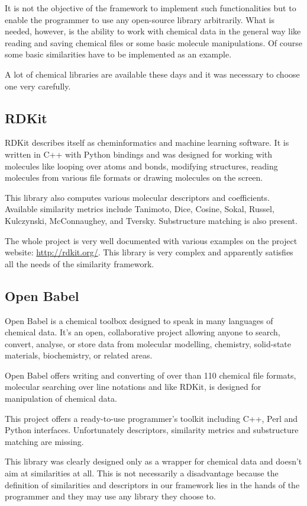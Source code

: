 \documentclass[thesis=M,english]{FITthesis}[2012/10/20]
\begin{document}
It is not the objective of the framework to implement such functionalities but to enable the programmer to use any open-source library arbitrarily. What is needed, however, is the ability to work with chemical data in the general way like reading and saving chemical files or some basic molecule manipulations. Of course some basic similarities have to be implemented as an example. 

A lot of chemical libraries are available these days and it was necessary to choose one very carefully.


\subsection{RDKit}
RDKit describes itself as cheminformatics and machine learning software.  It is written in C++ with Python bindings and was designed for working with molecules like looping over atoms and bonds, modifying structures, reading molecules from various file formats or drawing molecules on the screen. 

This library also computes various molecular descriptors and coefficients. Available similarity metrics include Tanimoto, Dice, Cosine, Sokal, Russel, Kulczynski, McConnaughey, and Tversky. Substructure matching is also present.

The whole project is very well documented with various examples on the project website: \url{http://rdkit.org/}.
This library is very complex and apparently satisfies all the needs of the similarity framework.


\subsection{Open Babel}
Open Babel is a chemical toolbox designed to speak in many languages of chemical data. It's an open, collaborative project allowing anyone to search, convert, analyse, or store data from molecular modelling, chemistry, solid-state materials, biochemistry, or related areas.\cite{babel}

Open Babel offers writing and converting of over than 110 chemical file formats, molecular searching over line notations and like RDKit, is designed for manipulation of chemical data.

This project offers a ready-to-use programmer’s toolkit including C++, Perl and Python interfaces. Unfortunately descriptors, similarity metrics and substructure matching are missing. 

This library was clearly designed only as a wrapper for chemical data and doesn’t aim at similarities at all. This is not necessarily a disadvantage because the definition of similarities and descriptors in our framework lies in the hands of the programmer and they may use any library they choose to. 
\end{document}
